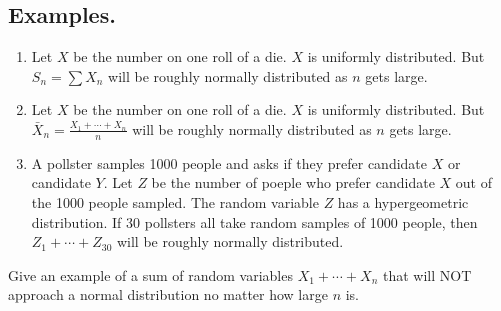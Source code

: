 \documentclass[titlepage, 12pt, leqno]{article}
\begin{document}
\pagebreak
\subsection{Examples.}
\begin{enumerate}
    \item Let $X$ be the number on one roll of a die. $X$ is uniformly 
        distributed. But $S_n = \sum X_n$ will be roughly normally distributed as
        $n$ gets large.
    \item Let $X$ be the number on one roll of a die. $X$ is uniformly 
        distributed. But $ \bar X_n = \frac{X_1+ \cdots +X_n}{n}$ will be
        roughly normally distributed as $n$ gets large.
    \item A pollster samples 1000 people and asks if they prefer candidate $X$ or
        candidate $Y$. Let $Z$ be the number of poeple who prefer candidate $X$
        out of the 1000 people sampled. The random variable $Z$ has a 
        hypergeometric distribution. If 30 pollsters all take random samples of
        1000 people, then $Z_1 + \cdots  + Z_{30}$ will be roughly normally
        distributed.
\end{enumerate}

\begin{ex}
    Give an example of a sum of random variables $X_1 + \cdots + X_n$ that will
    NOT approach a normal distribution no matter how large $n$ is.
\end{ex}

\pagebreak
\end{document}
